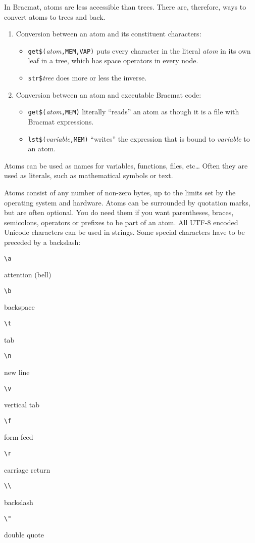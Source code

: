 \documentclass[12pt]{article}
\begin{document}
In Bracmat, atoms are less accessible than trees. There are, therefore, 
ways to convert atoms to trees and back.
\begin{enumerate}
\item Conversion between an atom and its constituent characters:
  \begin{itemize}
  \item
    \verb|get$(|\emph{atom}\verb|,MEM,VAP)| puts every character in
    the literal \emph{atom} in its own leaf in a tree, which has space
    operators in every node.
  \item \verb|str$|\emph{tree} does more or less the inverse.
  \end{itemize}
\item Conversion between an atom and executable Bracmat code:
  \begin{itemize}
  \item
    \verb|get$(|\emph{atom}\verb|,MEM)| literally ``reads'' an atom as
    though it is a file with Bracmat expressions.
  \item \verb|lst$(|\emph{variable}\verb|,MEM)| ``writes'' the
    expression that is bound to \emph{variable} to an atom.
  \end{itemize}
\end{enumerate}

Atoms can be used as names for variables, functions, files, etc\ldots
Often they are used as literals, such as mathematical symbols or text.

Atoms consist of any number of non-zero bytes, up to the limits set by
the operating system and hardware. Atoms can be surrounded by
quotation marks, but are often optional. You do need them if
you want parentheses, braces, semicolons, operators or prefixes to be
part of an atom. All UTF-8 encoded Unicode characters can be used in
strings. Some special characters have to be preceded by a backslash:
\begin{description}
\item  \verb|\a|\par
  attention (bell)
\item \verb|\b|\par
  backspace
\item \verb|\t|\par
  tab
\item \verb|\n|\par
  new line
\item \verb|\v|\par
  vertical tab
\item \verb|\f|\par
  form feed
\item \verb|\r|\par
  carriage return
\item \verb|\\|\par
  backslash
\item \verb|\"|\par
  double quote
\end{description}
\end{document}
